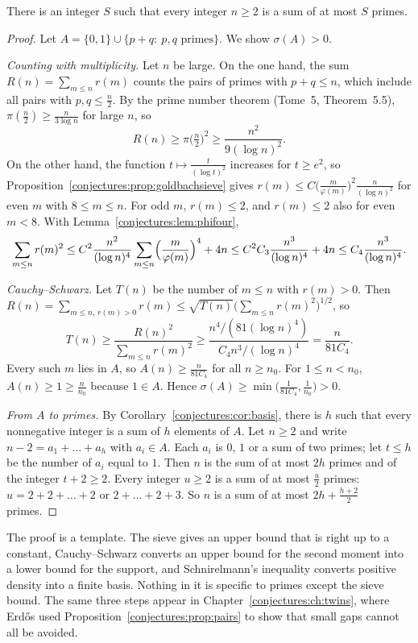 \begin{theorem}[Schnirelmann, 1930]\label{conjectures:thm:schnirelmann}
There is an integer $S$ such that every integer $n\ge2$ is a sum of at most $S$ primes.
\end{theorem}
\begin{proof}
Let $A=\{0,1\}\cup\{p+q:\ p,q\text{ primes}\}$. We show $\sigma(A)>0$.

\emph{Counting with multiplicity.} Let $n$ be large. On the one hand, the sum $R(n)=\sum_{m\le n}r(m)$ counts the pairs of primes with $p+q\le n$, which
include all pairs with $p,q\le\frac n2$. By the prime number theorem (Tome~5, Theorem~5.5), $\pi(\frac n2)\ge\frac n{3\log n}$ for large $n$, so
\[
R(n)\ge\pi\bigl(\tfrac n2\bigr)^2\ge\frac{n^2}{9(\log n)^2}.
\]
On the other hand, the function $t\mapsto\frac t{(\log t)^2}$ increases for $t\ge e^2$, so Proposition~\ref{conjectures:prop:goldbachsieve} gives
$r(m)\le C\bigl(\frac m{\varphi(m)}\bigr)^2\frac n{(\log n)^2}$ for even $m$ with $8\le m\le n$. For odd $m$, $r(m)\le2$, and $r(m)\le2$ also for even $m<8$.
With Lemma~\ref{conjectures:lem:phifour},
\[
\sum_{m\le n}r(m)^2\le C^2\frac{n^2}{(\log n)^4}\sum_{m\le n}\Bigl(\frac m{\varphi(m)}\Bigr)^4+4n\le C^2C_3\frac{n^3}{(\log n)^4}+4n\le C_4\frac{n^3}{(\log n)^4}.
\]

\emph{Cauchy--Schwarz.} Let $T(n)$ be the number of $m\le n$ with $r(m)>0$. Then $R(n)=\sum_{m\le n,\,r(m)>0}r(m)\le\sqrt{T(n)}\bigl(\sum_{m\le n}r(m)^2\bigr)^{1/2}$,
so
\[
T(n)\ge\frac{R(n)^2}{\sum_{m\le n}r(m)^2}\ge\frac{n^4/(81(\log n)^4)}{C_4n^3/(\log n)^4}=\frac n{81C_4}.
\]
Every such $m$ lies in $A$, so $A(n)\ge\frac n{81C_4}$ for all $n\ge n_0$. For $1\le n<n_0$, $A(n)\ge1\ge\frac n{n_0}$ because $1\in A$. Hence
$\sigma(A)\ge\min\bigl(\frac1{81C_4},\frac1{n_0}\bigr)>0$.

\emph{From $A$ to primes.} By Corollary~\ref{conjectures:cor:basis}, there is $h$ such that every nonnegative integer is a sum of $h$ elements of $A$. Let $n\ge2$ and write
$n-2=a_1+\dots+a_h$ with $a_i\in A$. Each $a_i$ is $0$, $1$ or a sum of two primes; let $t\le h$ be the number of $a_i$ equal to $1$. Then $n$ is the sum
of at most $2h$ primes and of the integer $t+2\ge2$. Every integer $u\ge2$ is a sum of at most $\frac u2$ primes: $u=2+2+\dots+2$ or $2+\dots+2+3$.
So $n$ is a sum of at most $2h+\frac{h+2}2$ primes.
\end{proof}

The proof is a template. The sieve gives an upper bound that is right up to a constant, Cauchy--Schwarz converts an upper bound for the second moment
into a lower bound for the support, and Schnirelmann's inequality converts positive density into a finite basis. Nothing in it is specific to primes
except the sieve bound. The same three steps appear in Chapter~\ref{conjectures:ch:twins}, where Erd\H{o}s used Proposition~\ref{conjectures:prop:pairs} to show that small
gaps cannot all be avoided.

